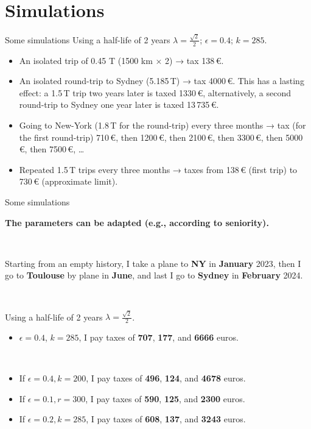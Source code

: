 \documentclass[french, english]{beamer}
\begin{document}
\section{Simulations}
\begin{frame}{Some simulations}
    Using a half-life of 2 years $\lambda = \frac{\sqrt{2}}{2}$; $\epsilon = 0.4$; $k = 285$.
    \begin{itemize}
    	\item An isolated trip of 0.45 T (1500 km × 2) → tax 138\,€.
	\item An isolated round-trip to Sydney (5.185\,T) → tax 4000\,€. This has a lasting effect: a 1.5\,T trip two years later is taxed 1330\,€, alternatively, a second round-trip to Sydney one year later is taxed 13\,735\,€.
	\item Going to New-York (1.8\,T for the round-trip) every three months → tax (for the first round-trip) 710\,€, then 1200\,€, then 2100\,€, then 3300\,€, then 5000\,€, then 7500\,€, …
	\item Repeated 1.5\,T trips every three months → taxes from 138\,€ (first trip) to 730\,€ (approximate limit).
	\end{itemize}
\end{frame}

\begin{frame}{Some simulations}

    \textbf{The parameters can be adapted (e.g., according to seniority).}
    
    \
    
    Starting from an empty history, I take a plane to \textbf{NY} in \textbf{January} 2023, then I go to \textbf{Toulouse} by plane in \textbf{June}, and  last I go to \textbf{Sydney} in \textbf{February} 2024. 
    
    \
    
    Using a half-life of 2 years $\lambda = \frac{\sqrt{2}}{2}$.
    \begin{itemize}
    \item $\epsilon = 0.4$, $k=285$, I pay taxes of \textbf{707}, \textbf{177}, and \textbf{6666} euros.
    \end{itemize}
    
    \
    
    \begin{itemize}
    \item If $\epsilon = 0.4, k = 200$, I pay taxes of \textbf{496}, \textbf{124}, and \textbf{4678} euros. 
    \item If $\epsilon = 0.1, r = 300$, I pay taxes of \textbf{590}, \textbf{125}, and \textbf{2300} euros.
    \item If $\epsilon = 0.2, k = 285$, I pay taxes of \textbf{608}, \textbf{137}, and \textbf{3243} euros. 
    \end{itemize}
\end{frame}
\end{document}
